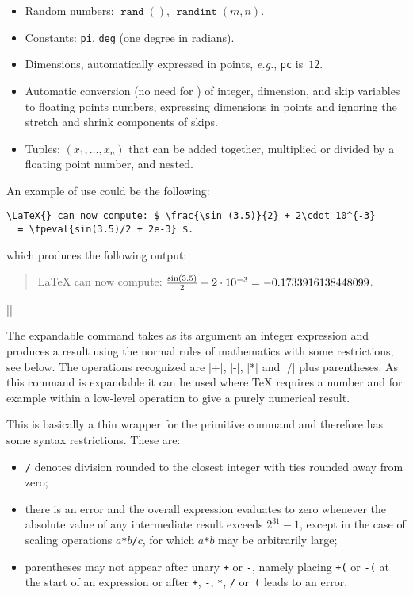 \documentclass{ltxguide}
\providecommand\fpop[1]{\mathop{\texttt{#1}}}
\begin{document}
\begin{itemize}
  \item Random numbers: $\fpop{rand}()$, $\fpop{randint}(m,n)$.
  \item Constants: \texttt{pi}, \texttt{deg} (one degree in radians).
  \item Dimensions, automatically expressed in points, \emph{e.g.},
    \texttt{pc} is~$12$.
  \item Automatic conversion (no need for ) of
    integer, dimension, and skip variables to floating points numbers,
    expressing dimensions in points and ignoring the stretch and
    shrink components of skips.
  \item Tuples: $(x_1,\ldots{},x_n)$ that can be added together,
    multiplied or divided by a floating point number, and nested.
\end{itemize}

An example of use could be the following:
\begin{verbatim}
\LaTeX{} can now compute: $ \frac{\sin (3.5)}{2} + 2\cdot 10^{-3}
  = \fpeval{sin(3.5)/2 + 2e-3} $.
\end{verbatim}
which produces the following output:
\begin{quote}
  \LaTeX{} can now compute: $ \frac{\sin (3.5)}{2} + 2\cdot 10^{-3}
  = \fpeval{sin(3.5)/2 + 2e-3} $.
\end{quote}

\begin{decl}
  |\inteval| 
\end{decl}

  The expandable command  takes as its argument an integer
  expression and produces a result using the normal rules of
  mathematics with some restrictions, see below. The operations
  recognized are |+|, |-|, |*| and |/| plus parentheses.  As this
  command is expandable it can be used where \TeX{} requires a number
  and for example within a low-level  operation to give a
  purely numerical result.

  This is basically a thin wrapper for the primitive 
  command and therefore has some syntax restrictions. These are:
  \begin{itemize}
  \item \texttt{/} denotes division rounded to the closest integer with
    ties rounded away from zero;
  \item there is an error and the overall expression evaluates to zero
    whenever the absolute value of any intermediate result exceeds
    $2^{31}-1$, except in the case of scaling operations
    $a$\texttt{*}$b$\texttt{/}$c$, for which $a$\texttt{*}$b$ may be
    arbitrarily large;
  \item parentheses may not appear after unary \texttt{+} or
    \texttt{-}, namely placing \texttt{+(} or \texttt{-(} at the start
    of an expression or after \texttt{+}, \texttt{-}, \texttt{*},
    \texttt{/} or~\texttt{(} leads to an error.
  \end{itemize}
\end{document}

